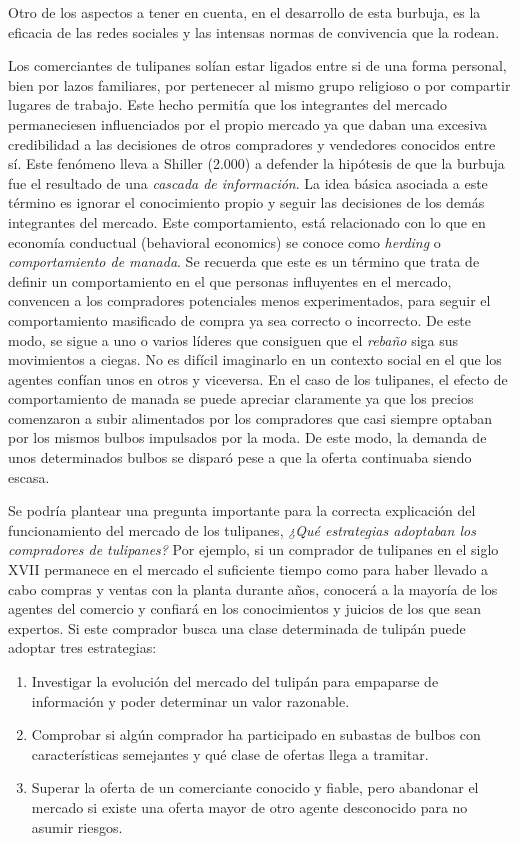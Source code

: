 Otro de los aspectos a tener en cuenta, en el desarrollo de esta burbuja, es la eficacia de las redes sociales y las intensas normas de convivencia que la rodean.

Los comerciantes de tulipanes solían estar ligados entre si de una forma personal, bien por lazos familiares, por pertenecer al mismo grupo religioso o por compartir lugares de trabajo. Este hecho permitía que los integrantes del mercado permaneciesen influenciados por el propio mercado ya que daban una excesiva credibilidad a las decisiones de otros compradores y vendedores conocidos entre sí. Este fenómeno lleva a Shiller (2.000) a defender la hipótesis de que la burbuja fue el resultado de una \emph{cascada de información}. La idea básica asociada a este término es ignorar el conocimiento propio y seguir las decisiones de los demás integrantes del mercado. Este comportamiento, está relacionado con lo que en economía conductual (behavioral economics) se conoce como \emph{herding} o \emph{comportamiento de manada}. Se recuerda que este es un término  que trata de definir un comportamiento en el que personas influyentes en el mercado, convencen a los compradores potenciales menos experimentados, para seguir el comportamiento masificado de compra ya sea correcto o incorrecto. De este modo, se sigue a uno o varios líderes que consiguen que el \emph{rebaño} siga sus movimientos a ciegas. No es difícil imaginarlo en un contexto social en el que los agentes confían unos en otros y viceversa. En el caso de los tulipanes, el efecto de comportamiento de manada se puede apreciar claramente ya que los precios comenzaron a subir alimentados por los compradores que casi siempre optaban por los mismos bulbos impulsados por la moda. De este modo, la demanda de unos determinados bulbos se disparó pese a que la oferta continuaba siendo escasa.

Se podría plantear una pregunta importante para la correcta explicación del funcionamiento del mercado de los tulipanes, \emph{¿Qué estrategias adoptaban los compradores de tulipanes?} Por ejemplo, si un comprador de tulipanes en el siglo XVII permanece en el mercado el suficiente tiempo como para haber llevado a cabo compras y ventas con la planta durante años, conocerá a la mayoría de los agentes del comercio y confiará en los conocimientos y juicios de los que sean expertos. Si este comprador busca una clase determinada de tulipán puede adoptar tres estrategias:

\begin{enumerate}
	\item Investigar la evolución del mercado del tulipán para empaparse de información y poder determinar un valor razonable.
	\item Comprobar si algún comprador ha participado en subastas de bulbos con características semejantes y qué clase de ofertas llega a tramitar.
	\item Superar la oferta de un comerciante conocido y fiable, pero abandonar el mercado si existe una oferta mayor de otro agente desconocido para no asumir riesgos.
\end{enumerate}


